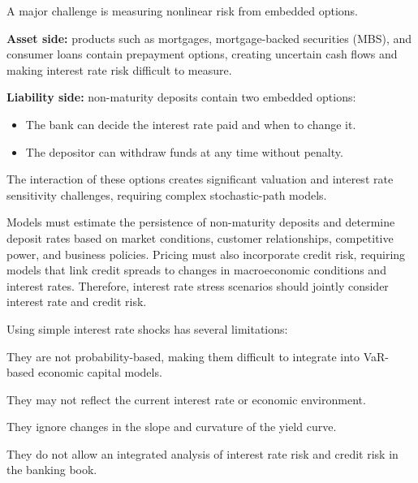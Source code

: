 
A major challenge is measuring nonlinear risk from embedded options.

\begin{lettered}
\item \textbf{Asset side:} products such as mortgages, mortgage-backed securities
(MBS), and consumer loans contain prepayment options, creating uncertain cash
flows and making interest rate risk difficult to measure.
\item \textbf{Liability side:} non-maturity deposits contain two embedded options:
  \begin{itemize}
  \item The bank can decide the interest rate paid and when to change it.
  \item The depositor can withdraw funds at any time without penalty.
  \end{itemize}
\end{lettered}

The interaction of these options creates significant valuation and interest rate
sensitivity challenges, requiring complex stochastic-path models.


Models must estimate the persistence of non-maturity deposits and determine deposit
rates based on market conditions, customer relationships, competitive power, and
business policies. Pricing must also incorporate credit risk, requiring models that
link credit spreads to changes in macroeconomic conditions and interest rates.
Therefore, interest rate stress scenarios should jointly consider interest rate and
credit risk.


Using simple interest rate shocks has several limitations:

\begin{checks}
\item They are not probability-based, making them difficult to integrate into
VaR-based economic capital models.
\item They may not reflect the current interest rate or economic environment.
\item They ignore changes in the slope and curvature of the yield curve.
\item They do not allow an integrated analysis of interest rate risk and credit
risk in the banking book.
\end{checks}

